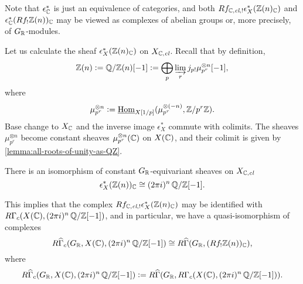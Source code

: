 Note that $\epsilon_{\mathbb{C}}^*$ is just an equivalence of categories, and both
$R f_{\mathbb{C}, \text{\it cl}, !} \epsilon_X^* (\mathbb{Z} (n)_{\mathbb{C}})$ and
$\epsilon_{\mathbb{C}}^* (R f_! \mathbb{Z} (n))_{\mathbb{C}}$ may be viewed as complexes of abelian
groups or, more precisely, of $G_{\mathbb{R}}$-modules.

Let us calculate the sheaf $\epsilon_X^* (\mathbb{Z} (n)_{\mathbb{C}})$ on
$X_{\mathbb{C},\text{\it cl}}$. Recall that by definition,
\[ \mathbb{Z} (n) \mathrel{\mathop:}= \mathbb{Q}/\mathbb{Z} (n) [-1] \mathrel{\mathop:}=
  \bigoplus_p \varinjlim_r j_{p!} \mu_{p^r}^{\otimes n} [-1], \]
where
\[ \mu_{p^r}^{\otimes n} \mathrel{\mathop:}=
  \underline{\operatorname{Hom}}_{X [1/p]} (\mu_{p^r}^{\otimes (-n)}, \mathbb{Z}/p^r\mathbb{Z}). \]
Base change to $X_{\mathbb{C}}$ and the inverse image $\epsilon_X^*$ commute with
colimits. The sheaves $\mu_{p^r}^{\otimes n}$ become constant sheaves
$\mu_{p^r}^{\otimes n} (\mathbb{C})$ on $X (\mathbb{C})$, and their colimit is given by
\ref{lemma:all-roots-of-unity-as-QZ}.

\begin{proposition}
  There is an isomorphism of constant $G_{\mathbb{R}}$-equivariant sheaves on
  $X_{\mathbb{C},\text{\it cl}}$
  $$\epsilon_X^* (\mathbb{Z} (n))_{\mathbb{C}} \cong (2\pi i)^n\,\mathbb{Q}/\mathbb{Z} [-1].$$
\end{proposition}

This implies that the complex
$R f_{\mathbb{C}, \text{\it cl}, !} \epsilon_X^* (\mathbb{Z} (n)_{\mathbb{C}})$ may be identified with
$R\Gamma_c (X (\mathbb{C}), (2\pi i)^n\,\mathbb{Q}/\mathbb{Z} [-1])$, and in particular, we have a
quasi-isomorphism of complexes
\begin{equation}
  \label{eqn:1150199388}
  R\widehat{\Gamma}_c (G_{\mathbb{R}}, X (\mathbb{C}), (2\pi i)^n\,\mathbb{Q}/\mathbb{Z} [-1]) \cong
  R\widehat{\Gamma} (G_{\mathbb{R}}, (R f_! \mathbb{Z} (n))_{\mathbb{C}}),
\end{equation}
where
\[ R\widehat{\Gamma}_c (G_{\mathbb{R}}, X (\mathbb{C}), (2\pi i)^n\,\mathbb{Q}/\mathbb{Z} [-1]) \mathrel{\mathop:}=
  R\widehat{\Gamma} (G_{\mathbb{R}}, R\Gamma_c (X (\mathbb{C}), (2\pi i)^n\,\mathbb{Q}/\mathbb{Z} [-1])). \]

